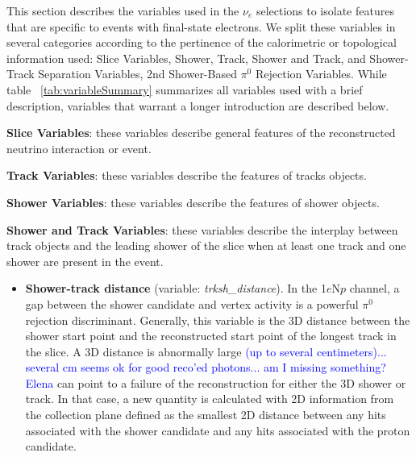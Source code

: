 \par This section describes the variables used in the $\nu_e$ selections to isolate features that are specific to events with final-state electrons. We split these variables in several categories according to the pertinence of the calorimetric or topological information used: Slice Variables, Shower, Track, Shower and Track, and Shower-Track Separation Variables,  2nd Shower-Based $\pi^0$ Rejection Variables.  While table ~\ref{tab:variableSummary} summarizes all variables used with a brief description, variables that warrant a longer introduction are described below.

\par \noindent  \textbf{Slice Variables}: these variables describe general features of the reconstructed neutrino interaction or event.
\par \noindent  \textbf{Track Variables}: these variables describe the features of tracks objects.
\par \noindent \textbf{Shower Variables}:  these variables describe the features of shower objects.
\par \noindent \textbf{Shower and Track Variables}: these variables describe the interplay between track objects and the leading shower of the slice when at least one track and one shower are present in the event. 
\begin{itemize}
 \item[] \textbf{Shower-track distance} (variable: \emph{trksh\_distance}).  In the 1$e$N$p$ channel, a gap between the shower candidate and vertex activity is a powerful $\pi^0$ rejection discriminant.  Generally, this variable is the 3D distance between the shower start point and the reconstructed start point of the longest track in the slice. A 3D distance is abnormally large \textcolor{blue}{(up to several centimeters)... several cm seems ok for good reco'ed photons... am I missing something? Elena} can point to a failure of the reconstruction for either the 3D shower or track. In that case, a new quantity is calculated with 2D information from the collection plane defined as the smallest 2D distance between any hits associated with the shower candidate and any hits associated with the proton candidate. 
\end{itemize}



